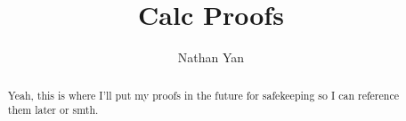 \documentclass{article}
\title{Calc Proofs}
\author{Nathan Yan}
\begin{document}
\newcommand{\e}{\varepsilon}
\maketitle
\clearpage
\hypersetup{allcolors=black}
\tableofcontents
\hypersetup{allcolors=blue}  %
\clearpage



\begin{abstract}
Yeah, this is where I'll put my proofs in the future for safekeeping so I can reference them later or smth.
\end{abstract}








\end{document}
